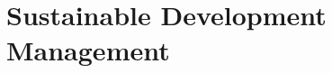 \chapter{Sustainable Development Management}\label{chap:baseline_sustainable_development_management}